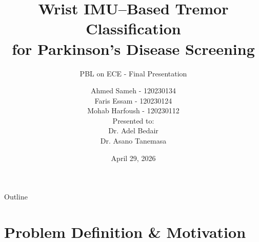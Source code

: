 \documentclass[aspectratio=169, 11pt]{beamer}
\title[IMU Tremor Classification]{%
  Wrist IMU--Based Tremor Classification\\
  for Parkinson's Disease Screening}
\subtitle{PBL on ECE - Final Presentation}
\author{Ahmed Sameh - 120230134 \\ Faris Essam - 120230124 \\ Mohab Harfoush - 120230112 \vspace{0.5em} \\ {\small Presented to: \\ Dr. Adel Bedair \\ Dr. Asano Tanemasa}   }
\institute{Egypt - Japan University of Science and Technology}
\date{April 29, 2026}
\begin{document}

\begin{frame}
  \titlepage
\end{frame}

\begin{frame}{Outline}
  \tableofcontents
\end{frame}

\section{Problem Definition \& Motivation}
\end{document}

